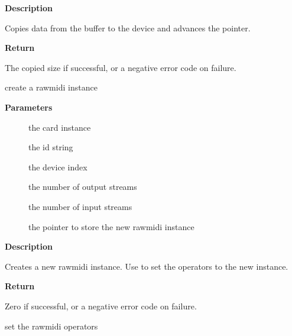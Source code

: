 \documentclass[a4paper,8pt,english]{sphinxmanual}
\begin{document}
\textbf{Description}

Copies data from the buffer to the device and advances the pointer.

\textbf{Return}

The copied size if successful, or a negative error code on failure.

\begin{fulllineitems}
\label{sound/kernel-api/alsa-driver-api:c.snd_rawmidi_new}
create a rawmidi instance

\end{fulllineitems}


\textbf{Parameters}
\begin{description}
\item[{}] \leavevmode
the card instance

\item[{}] \leavevmode
the id string

\item[{}] \leavevmode
the device index

\item[{}] \leavevmode
the number of output streams

\item[{}] \leavevmode
the number of input streams

\item[{}] \leavevmode
the pointer to store the new rawmidi instance

\end{description}

\textbf{Description}

Creates a new rawmidi instance.
Use  to set the operators to the new instance.

\textbf{Return}

Zero if successful, or a negative error code on failure.

\begin{fulllineitems}
\label{sound/kernel-api/alsa-driver-api:c.snd_rawmidi_set_ops}
set the rawmidi operators

\end{fulllineitems}
\end{document}
